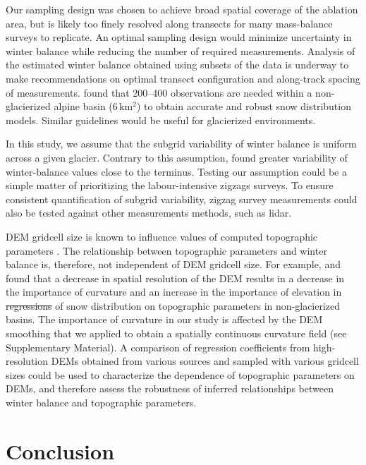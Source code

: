 \documentclass[review,oneside, letterpaper]{igs} %
\providecommand{\DIFadd}[1]{{\protect\color{blue}\uwave{#1}}} %
\providecommand{\DIFdel}[1]{{\protect\color{red}\sout{#1}}}                      %
\providecommand{\DIFaddbegin}{} %
\providecommand{\DIFaddend}{} %
\providecommand{\DIFdelbegin}{} %
\providecommand{\DIFdelend}{} %
\newcommand{\DIFscaledelfig}{0.5}
\newlength{\DIFdelgraphicswidth} %
\newlength{\DIFdelgraphicsheight} %
\newcommand{\DIFaddincludegraphics}[2][]{{\color{blue}\fbox{\DIFOincludegraphics[#1]{#2}}}} %
\newcommand{\DIFdelincludegraphics}[2][]{%
\sbox{\DIFdelgraphicsbox}{\DIFOincludegraphics[#1]{#2}}%
\settoboxwidth{\DIFdelgraphicswidth}{\DIFdelgraphicsbox} %
\settoboxtotalheight{\DIFdelgraphicsheight}{\DIFdelgraphicsbox} %
\scalebox{\DIFscaledelfig}{%
\parbox[b]{\DIFdelgraphicswidth}{\usebox{\DIFdelgraphicsbox}\\[-\baselineskip] \rule{\DIFdelgraphicswidth}{0em}}\llap{\resizebox{\DIFdelgraphicswidth}{\DIFdelgraphicsheight}{%
\setlength{\unitlength}{\DIFdelgraphicswidth}%
\begin{picture}(1,1)%
\thicklines\linethickness{2pt} %
{\color[rgb]{1,0,0}\put(0,0){\framebox(1,1){}}}%
{\color[rgb]{1,0,0}\put(0,0){\line( 1,1){1}}}%
{\color[rgb]{1,0,0}\put(0,1){\line(1,-1){1}}}%
\end{picture}%
}\hspace*{3pt}}} %
} %
\DeclareRobustCommand{\DIFaddbegin}{\DIFOaddbegin \let\includegraphics\DIFaddincludegraphics} %
\DeclareRobustCommand{\DIFaddend}{\DIFOaddend \let\includegraphics\DIFOincludegraphics} %
\DeclareRobustCommand{\DIFdelbegin}{\DIFOdelbegin \let\includegraphics\DIFdelincludegraphics} %
\DeclareRobustCommand{\DIFdelend}{\DIFOaddend \let\includegraphics\DIFOincludegraphics} %
\begin{document}
Our sampling design was chosen to achieve broad spatial coverage of the ablation area, but is likely too finely resolved along transects for many mass-balance surveys to replicate. An optimal sampling design would minimize uncertainty in winter balance while reducing the number of required measurements. Analysis of the estimated winter balance obtained using subsets of the data is underway to make recommendations on optimal transect configuration and along-track spacing of measurements. \cite{Lopez2010} found that 200--400 observations are needed within a non-glacierized alpine basin (6\,km$^2$) to obtain accurate and robust snow distribution models. Similar guidelines would be useful for glacierized environments.

In this study, we assume that the subgrid variability of winter balance is uniform across a given glacier. Contrary to this assumption, \cite{McGrath2015} found greater variability of winter-balance values close to the terminus. Testing our assumption could be a simple matter of prioritizing the labour-intensive zigzags surveys. To ensure consistent quantification of subgrid variability, zigzag survey measurements could also be tested against other measurements methods, such as lidar. 

DEM gridcell size is known to influence values of computed topographic parameters \citep{Zhang1994, Garbrecht1994, Guo-an2001, Lopez2010}. The relationship between topographic parameters and winter balance is, therefore, not independent of DEM gridcell size. For example, \cite{Kienzle2004} and \cite{Lopez2010} found that a decrease in spatial resolution of the DEM results in a decrease in the importance of curvature and an increase in the importance of elevation in \DIFdelbegin \DIFdel{regressions }\DIFdelend \DIFaddbegin \DIFadd{LR }\DIFaddend of snow distribution on topographic parameters in non-glacierized basins. The importance of curvature in our study is affected by the DEM smoothing that we applied to obtain a spatially continuous curvature field (see Supplementary Material). A comparison of regression coefficients from high-resolution DEMs obtained from various sources and sampled with various gridcell sizes could be used to characterize the dependence of topographic parameters on DEMs, and therefore assess the robustness of inferred relationships between winter balance and topographic parameters. 


\section{Conclusion}
\end{document}
